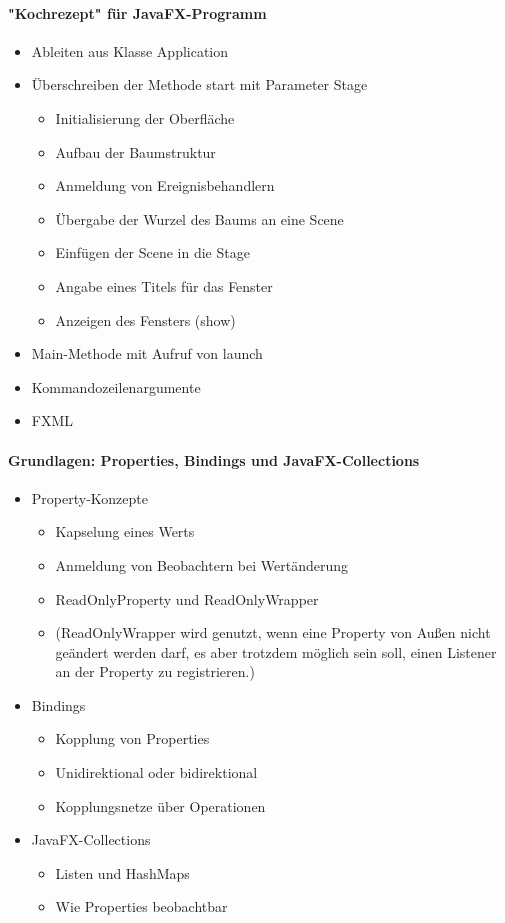 \paragraph*{"Kochrezept" für JavaFX-Programm}

\begin{itemize}
    \item Ableiten aus Klasse Application
    \item Überschreiben der Methode start mit Parameter Stage
    \begin{itemize}
        \item Initialisierung der Oberfläche
        \item Aufbau der Baumstruktur
        \item Anmeldung von Ereignisbehandlern
        \item Übergabe der Wurzel des Baums an eine Scene
        \item Einfügen der Scene in die Stage
        \item Angabe eines Titels für das Fenster
        \item Anzeigen des Fensters (show)
    \end{itemize}
    \item Main-Methode mit Aufruf von launch
    \item Kommandozeilenargumente
    \item FXML
\end{itemize}

\paragraph*{Grundlagen: Properties, Bindings und JavaFX-Collections}

\begin{itemize}
    \item Property-Konzepte
    \begin{itemize}
        \item Kapselung eines Werts
        \item Anmeldung von Beobachtern bei Wertänderung
        \item ReadOnlyProperty und ReadOnlyWrapper
        \item[](ReadOnlyWrapper wird genutzt, wenn eine Property von Außen nicht geändert werden darf, es aber trotzdem möglich sein soll, einen Listener an der Property zu registrieren.)
    \end{itemize}
    \item Bindings
    \begin{itemize}
        \item Kopplung von Properties
        \item Unidirektional oder bidirektional
        \item Kopplungsnetze über Operationen
    \end{itemize}
    \item JavaFX-Collections
    \begin{itemize}
        \item Listen und HashMaps
        \item Wie Properties beobachtbar
    \end{itemize}
\end{itemize}

